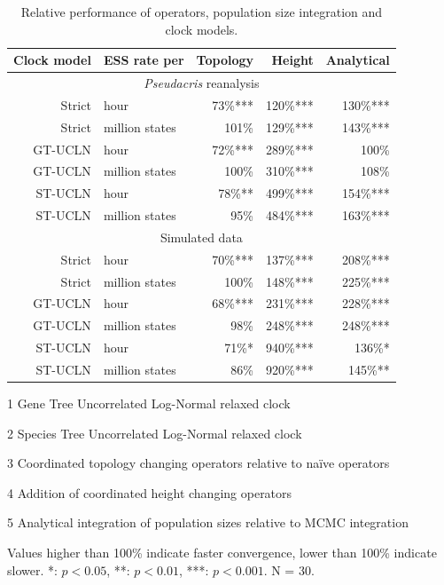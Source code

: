 \documentclass[12pt]{article}
\begin{document}
\begin{table}[htb!]
\caption{Relative performance of operators, population size integration and clock models.}
\label{tab:convergenceLM}
\begin{threeparttable}
\begin{tabular*}{\textwidth}{@{\extracolsep{\fill}}rlrrr@{}}
\hline
Clock model & ESS rate per & Topology\tnote{3} & Height\tnote{4} & Analytical\tnote{5}\tabularnewline
\hline
\multicolumn{5}{c}{\textit{Pseudacris} reanalysis}\tabularnewline
\hline
Strict & hour & 73\%{***} & 120\%{***} & 130\%{***}\tabularnewline
Strict & million states & 101\%\hphantom{***} & 129\%{***} & 143\%{***}\tabularnewline
GT-UCLN\tnote{1} & hour & 72\%{***} & 289\%{***} & 100\%\hphantom{***}\tabularnewline
GT-UCLN & million states & 100\%\hphantom{***} & 310\%{***} & 108\%\hphantom{***}\tabularnewline
ST-UCLN\tnote{2} & hour & 78\%{**}\hphantom{*} & 499\%{***} & 154\%{***}\tabularnewline
ST-UCLN & million states & 95\%\hphantom{***} & 484\%{***} & 163\%{***}\tabularnewline
\hline
\multicolumn{5}{c}{Simulated data}\tabularnewline
\hline
Strict & hour & 70\%{***} & 137\%{***} & 208\%{***}\tabularnewline
Strict & million states & 100\%\hphantom{***} & 148\%{***} & 225\%{***}\tabularnewline
GT-UCLN & hour & 68\%{***} & 231\%{***} & 228\%{***}\tabularnewline
GT-UCLN & million states & 98\%\hphantom{***} & 248\%{***} & 248\%{***}\tabularnewline
ST-UCLN & hour & 71\%{*}\hphantom{**} & 940\%{***} & 136\%{*}\hphantom{**}\tabularnewline
ST-UCLN & million states & 86\%\hphantom{***} & 920\%{***} & 145\%{**}\hphantom{*}\tabularnewline
\hline
\end{tabular*}
\begin{tablenotes}
\item[1] Gene Tree Uncorrelated Log-Normal relaxed clock
\item[2] Species Tree Uncorrelated Log-Normal relaxed clock
\item[3] Coordinated topology changing operators relative to na\"ive operators
\item[4] Addition of coordinated height changing operators
\item[5] Analytical integration of population sizes relative to MCMC integration
\item Values higher than 100\% indicate faster convergence, lower than 100\% indicate slower. {*}: $p < 0.05$, {**}: $p < 0.01$, {***}: $p < 0.001$. N = 30.
\end{tablenotes}
\end{threeparttable}
\end{table}
\end{document}
